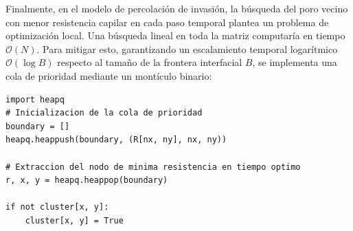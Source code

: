 Finalmente, en el modelo de percolación de invasión, la búsqueda del poro vecino con menor resistencia capilar en cada paso temporal plantea un problema de optimización local. Una búsqueda lineal en toda la matriz computaría en tiempo $\mathcal{O}(N)$. Para mitigar esto, garantizando un escalamiento temporal logarítmico $\mathcal{O}(\log B)$ respecto al tamaño de la frontera interfacial $B$, se implementa una cola de prioridad mediante un montículo binario:

\begin{lstlisting}
import heapq
# Inicializacion de la cola de prioridad
boundary = [] 
heapq.heappush(boundary, (R[nx, ny], nx, ny))

# Extraccion del nodo de minima resistencia en tiempo optimo
r, x, y = heapq.heappop(boundary)

if not cluster[x, y]:
    cluster[x, y] = True
\end{lstlisting}